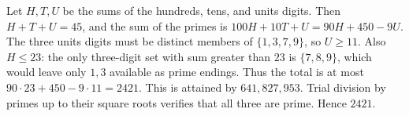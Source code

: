 Let $H,T,U$ be the sums of the hundreds, tens, and units digits. Then $H+T+U=45$, and the sum of the primes is $100H+10T+U=90H+450-9U$. The three units digits must be distinct members of $\{1,3,7,9\}$, so $U\ge11$. Also $H\le23$: the only three-digit set with sum greater than $23$ is $\{7,8,9\}$, which would leave only $1,3$ available as prime endings. Thus the total is at most $90\cdot23+450-9\cdot11=2421$. This is attained by $641,827,953$. Trial division by primes up to their square roots verifies that all three are prime. Hence $\boxed{2421}$.
